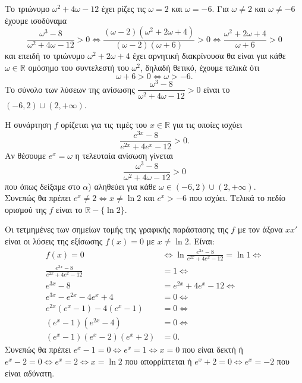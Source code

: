 \documentclass[11pt,a4paper,twoside]{book}
\begin{document}
\begin{alist}
\item Το τριώνυμο $\omega^2 + 4\omega - 12$ έχει ρίζες τις $\omega = 2$ και $\omega = -6$. Για $\omega \neq 2$ και $\omega \neq -6$ έχουμε ισοδύναμα
\[\frac{\omega^3 - 8}{\omega^2 + 4\omega - 12} > 0 \Leftrightarrow \frac{(\omega - 2)(\omega^2 + 2\omega + 4)}{(\omega - 2)(\omega + 6)} > 0 \Leftrightarrow \frac{\omega^2 + 2\omega + 4}{\omega + 6} > 0\]
και επειδή το τριώνυμο $\omega^2 + 2\omega + 4$ έχει αρνητική διακρίνουσα θα είναι για κάθε $\omega \in \mathbb{R}$ ομόσημο του συντελεστή του $\omega^2$, δηλαδή θετικό, έχουμε τελικά ότι
\[\omega + 6 > 0 \Leftrightarrow \omega > -6.\]
Το σύνολο των λύσεων της ανίσωσης $\dfrac{\omega^3 - 8}{\omega^2 + 4\omega - 12} > 0$ είναι το $(-6, 2) \cup (2, +\infty)$.
\item Η συνάρτηση $f$ ορίζεται για τις τιμές του $x \in \mathbb{R}$ για τις οποίες ισχύει
\[\frac{e^{3x} - 8}{e^{2x} + 4e^x - 12} > 0.\]
Αν θέσουμε $e^x = \omega$ η τελευταία ανίσωση γίνεται
\[\frac{\omega^3 - 8}{\omega^2 + 4\omega - 12} > 0\]
που όπως δείξαμε στο $\alpha$) αληθεύει για κάθε $\omega \in (-6, 2) \cup (2, +\infty)$. \\
Συνεπώς θα πρέπει $e^x \neq 2 \Leftrightarrow x \neq \ln 2$ και $e^x > -6$ που ισχύει. Τελικά το πεδίο ορισμού της $f$ είναι το $\mathbb{R} - \{\ln 2\}$.
\item Οι τετμημένες των σημείων τομής της γραφικής παράστασης της $f$ με τον άξονα $xx'$ είναι οι λύσεις της εξίσωσης $f(x) = 0$ με $x \neq \ln 2$. Είναι:
\begin{align*}
f(x) = 0 &\Leftrightarrow \ln\frac{e^{3x} - 8}{e^{2x} + 4e^x - 12} = \ln 1 \Leftrightarrow \\
\frac{e^{3x} - 8}{e^{2x} + 4e^x - 12} &= 1 \Leftrightarrow \\
e^{3x} - 8 &= e^{2x} + 4e^x - 12 \Leftrightarrow \\
e^{3x} - e^{2x} - 4e^x + 4 &= 0 \Leftrightarrow \\
e^{2x}(e^x - 1) - 4(e^x - 1) &= 0 \Leftrightarrow \\
(e^x - 1)(e^{2x} - 4) &= 0 \Leftrightarrow \\
(e^x - 1)(e^x - 2)(e^x + 2) &= 0.
\end{align*}
Συνεπώς θα πρέπει $e^x - 1 = 0 \Leftrightarrow e^x = 1 \Leftrightarrow x = 0$ που είναι δεκτή ή $e^x - 2 = 0 \Leftrightarrow e^x = 2 \Leftrightarrow x = \ln 2$ που απορρίπτεται ή $e^x + 2 = 0 \Leftrightarrow e^x = -2$ που είναι αδύνατη.
\end{alist}
\end{document}
